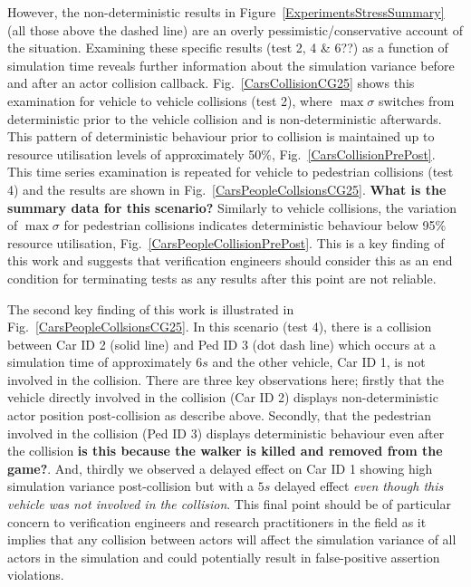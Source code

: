 \documentclass[letterpaper, 10 pt, journal, twoside]{IEEEtran}
\begin{document}
However, the non-deterministic results in Figure~\ref{ExperimentsStressSummary} (all those above the dashed line) are an overly pessimistic/conservative account of the situation. Examining these specific results (test 2, 4 \& 6??) as a function of simulation time reveals further information about the simulation variance before and after an actor collision callback. Fig.~\ref{CarsCollisionCG25} shows this examination for vehicle to vehicle collisions (test 2), where $\max\sigma$ switches from deterministic prior to the vehicle collision and is non-deterministic afterwards. This pattern of deterministic behaviour prior to collision is maintained up to resource utilisation levels of approximately 50\%, Fig.~\ref{CarsCollisionPrePost}. This time series examination is repeated for vehicle to pedestrian collisions (test 4) and the results are shown in Fig.~\ref{CarsPeopleCollsionsCG25}. \textbf{What is the summary data for this scenario?} Similarly to vehicle collisions, the variation of $\max\sigma$ for pedestrian collisions indicates deterministic behaviour below 95\% resource utilisation, Fig.~\ref{CarsPeopleCollisionPrePost}. This is a key finding of this work and suggests that verification engineers should consider this as an end condition for terminating tests as any results after this point are not reliable. 

The second key finding of this work is illustrated in Fig.~\ref{CarsPeopleCollsionsCG25}. In this scenario (test 4), there is a collision between Car ID 2 (solid line) and Ped ID 3 (dot dash line) which occurs at a simulation time of approximately $6s$ and the other vehicle, Car ID 1, is not involved in the collision. There are three key observations here; firstly that the vehicle directly involved in the collision (Car ID 2) displays non-deterministic actor position post-collision as describe above. Secondly, that the pedestrian involved in the collision (Ped ID 3) displays deterministic behaviour even after the collision \textbf{is this because the walker is killed and removed from the game?}. And, thirdly we observed a delayed effect on Car ID 1 showing high simulation variance post-collision but with a $5s$ delayed effect \textit{even though this vehicle was not involved in the collision}. This final point should be of particular concern to verification engineers and research practitioners in the field as it implies that any collision between actors will affect the simulation variance of all actors in the simulation and could potentially result in false-positive assertion violations.
\end{document}
